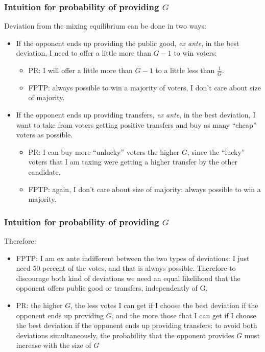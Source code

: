 \documentclass[11pt,aspectratio=169]{beamer}
\begin{document}
\begin{frame}
\frametitle{Intuition for probability of providing $G$}
\noindent Deviation from the mixing equilibrium can be done in two ways:
\begin{itemize}
\item If the opponent ends up providing the public good, \textit{ex ante}, in the best deviation, I need to offer a little more than $G-1$ to win voters:
\begin{itemize}
\item PR: I will offer a little more than $G-1$ to a little less than $\frac{1}{G}$.
\item FPTP: always possible to win a majority of voters, I don't care about size of majority. 
\end{itemize}
\item If the opponent ends up providing transfers, \textit{ex ante}, in the best deviation, I want to take from voters getting positive transfers and buy as many ``cheap'' voters as possible. 
\begin{itemize}
\item PR: I can buy more ``unlucky'' voters the higher $G$, since the ``lucky'' voters that I am taxing were getting a higher transfer by the other candidate.
\item FPTP: again, I don't care about size of majority: always possible to win a majority.
\end{itemize}
\end{itemize}

\end{frame}



\begin{frame}
\frametitle{Intuition for probability of providing $G$}
\noindent Therefore:
\begin{itemize}
\item FPTP:  I am ex ante indifferent between the two types of deviations: I just need 50 percent of the votes, and that is always possible. Therefore to discourage both kind of deviations we need an equal likelihood that the opponent offers public good or transfers, independently of G.
\item PR: the higher $G$, the less votes I can get if I choose the best deviation if the opponent ends up providing $G$, and the more those that I can get if I choose the best deviation if the opponent ends up providing transfers: to avoid both deviations simultaneously, the probability that the opponent provides $G$ must increase with the size of $G$
\end{itemize}
\end{frame}
\end{document}
